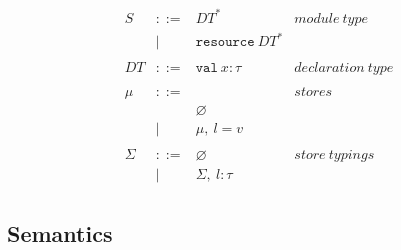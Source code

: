 \documentclass{llncs}
\newcommand{\keyw}[1]{\mathtt{#1}~}
\begin{document}
\[\begin{array}{lll}
\begin{array}{lllr}
&&\\
S & ::= & DT^* & module~type \\
& | & \keyw{resource} DT^* \\
&&\\
DT & ::= & \keyw{val} x : \tau & declaration~type\\
&&\\
\mu & ::= & & stores\\
& & \varnothing \\
& | & \mu,~l = v\\
&&\\
\Sigma & ::= & \varnothing & store~typings\\
& | & \Sigma,~l : \tau
\end{array}
\end{array}
\]

\newpage

\subsection{Semantics}
\end{document}
